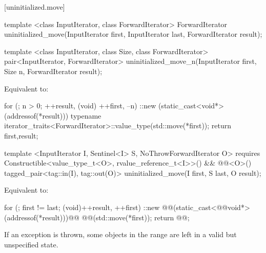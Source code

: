 [uninitialized.move]{}
{\color{remclr}
\begin{codeblock}
template <class InputIterator, class ForwardIterator>
  ForwardIterator uninitialized_move(InputIterator first, InputIterator last,
                                     ForwardIterator result);
\end{codeblock}

\begin{codeblock}
template <class InputIterator, class Size, class ForwardIterator>
  pair<InputIterator, ForwardIterator>
    uninitialized_move_n(InputIterator first, Size n, ForwardIterator result);
\end{codeblock}

\setcounter{Paras}{2}
\pnum
\effects Equivalent to:
\begin{codeblock}
        for (; n > 0; ++result, (void) ++first, --n)
          ::new (static_cast<void*>(addressof(*result)))
            typename iterator_traits<ForwardIterator>::value_type(std::move(*first));
        return {first,result};
\end{codeblock}
} %

{\color{addclr}
\begin{codeblock}
template <InputIterator I, Sentinel<I> S, NoThrowForwardIterator O>
  requires Constructible<value_type_t<O>, rvalue_reference_t<I>>() &&
           @@<O>()
    tagged_pair<tag::in(I), tag::out(O)> uninitialized_move(I first, S last, O result);
\end{codeblock}
} %

\setcounter{Paras}{0}
\pnum
\effects Equivalent to:
\begin{codeblock}
        for (; first != last; (void)++result, ++first)
          ::new @@(static_cast<@@void*>(addressof(*result)))@\added{)}@
            @@(std::move(*first));
        return @@;
\end{codeblock}

\pnum
\remarks If an exception is thrown, some objects in the range  are left in a valid but
unspecified state.

